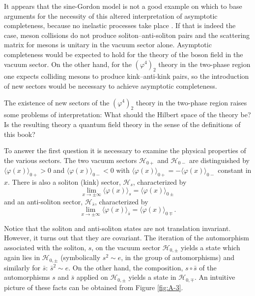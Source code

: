 It appears that the sine-Gordon model is not a good example on which to base
arguments for the necessity of this altered interpretation of asymptotic
completeness, because no inelastic processes take place \cite{pct-app-86}.  If that is
indeed the case, meson collisions do not produce soliton--anti-soliton pairs
and the scattering matrix for mesons is unitary in the vacuum sector alone.
Asymptotic completeness would be expected to hold for the theory of the
boson field in the vacuum sector.  On the other hand, for the
$(\varphi^4)_2$ theory in the two-phase region one expects colliding mesons to
produce kink--anti-kink pairs, so the introduction of new sectors would be
necessary to achieve asymptotic completeness.

The existence of new sectors of the $(\varphi^4)_2$ theory in the two-phase
region raises some problems of interpretation: What should the Hilbert space
of the theory be?  Is the resulting theory a quantum field theory in the
sense of the definitions of this book?

To answer the first question it is necessary to examine the physical
properties of the various sectors.  The two vacuum sectors $\mathcal H_{0+}$
and $\mathcal H_{0-}$ are distinguished by
$\langle\varphi(x)\rangle_{0+}>0$ and $\langle\varphi(x)\rangle_{0-}<0$ with
$\langle\varphi(x)\rangle_{0+}=-\langle\varphi(x)\rangle_{0-}$ constant in
$x$.  There is also a soliton (kink) sector, $\mathcal H_s$,
characterized by
\begin{equation*}
  \lim_{x\to\pm\infty}\langle\varphi(x)\rangle_s
  =\langle\varphi(x)\rangle_{0\pm}
\end{equation*}
and an anti-soliton sector, $\mathcal H_{\bar s}$, characterized by
\begin{equation*}
  \lim_{x\to\pm\infty}\langle\varphi(x)\rangle_{\bar s}
  =\langle\varphi(x)\rangle_{0\mp}.
\end{equation*}

Notice that the soliton and anti-soliton states are not translation invariant.
However, it turns out that they are covariant.  The iteration
of the automorphism associated with the soliton, $s$, on the vacuum sector
$\mathcal H_{0,\pm}$ yields a state which again lies in $\mathcal H_{0,\pm}$
(symbolically $s^2\sim e$, in the group of automorphisms) and similarly for
$\bar s$: $\bar s^2\sim e$.  On the other hand, the composition,
$s\mathbin\circ\bar s$ of the automorphisms $s$ and $\bar s$ applied on
$\mathcal H_{0,\pm}$ yields a state in $\mathcal H_{0,\mp}$.  An intuitive
picture of these facts can be obtained from Figure \ref{fig:A-3}.

